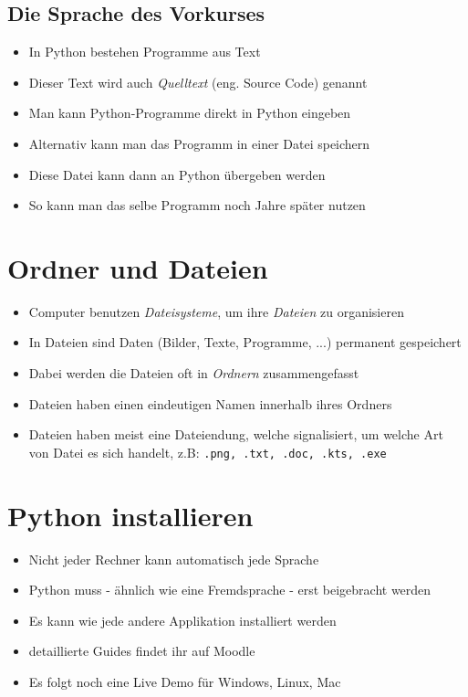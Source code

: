 \subsection{Die Sprache des Vorkurses}
\begin{frame}
    \slidehead
    \begin{itemize}[<+->]
        \item In Python bestehen Programme aus Text
        \item Dieser Text wird auch \emph{Quelltext} (eng. Source Code) genannt
        \item Man kann Python-Programme direkt in Python eingeben
        \item Alternativ kann man das Programm in einer Datei speichern
        \item Diese Datei kann dann an Python übergeben werden
        \item So kann man das selbe Programm noch Jahre später nutzen
    \end{itemize}
\end{frame}

\livecoding

\section{Ordner und Dateien}
\begin{frame}
    \slidehead
    \begin{itemize}
        \item Computer benutzen \emph{Dateisysteme}, um ihre \emph{Dateien} zu organisieren
        \item In Dateien sind Daten (Bilder, Texte, Programme, ...) permanent gespeichert
        \item Dabei werden die Dateien oft in \emph{Ordnern} zusammengefasst
        \item Dateien haben einen eindeutigen Namen innerhalb ihres Ordners
        \item Dateien haben meist eine Dateiendung, welche signalisiert, um welche Art von Datei es sich handelt, z.B: \verb#.png, .txt, .doc, .kts, .exe#
    \end{itemize}
\end{frame}

\section{Python installieren}
\begin{frame}
    \slidehead
    \begin{itemize}
        \item Nicht jeder Rechner kann automatisch jede Sprache
        \item Python muss - ähnlich wie eine Fremdsprache - erst beigebracht werden
        \item Es kann wie jede andere Applikation installiert werden
        \item detaillierte Guides findet ihr auf Moodle
        \item Es folgt noch eine Live Demo für Windows, Linux, Mac
    \end{itemize}
\end{frame}

